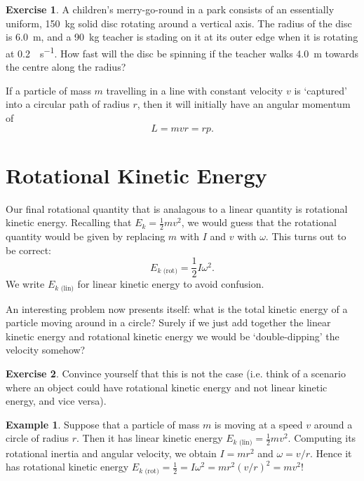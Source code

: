 \documentclass[a4paper]{amsbook}
\newcommand{\marginsymbol}{}
\newcommand{\ekl}{E_{k \text{ (lin)}}}
\newcommand{\ekr}{E_{k \text{ (rot)}}}
\theoremstyle{definition}
\newtheorem*{example}{Example}
\newtheorem{exercise}{Exercise}
\numberwithin{exercise}{chapter}
\numberwithin{exercise}{chapter}
\begin{document}
\begin{exercise}
  A children's merry-go-round in a park consists of an essentially uniform, \SI{150}{\kilo\gram} solid disc rotating around
  a vertical axis. The radius of the disc is \SI{6.0}{\metre}, and a \SI{90}{\kilo\gram} teacher is stading on it at its
  outer edge when it is rotating at \SI{0.2}{\revolution\per\second}. How fast will the disc be spinning if the teacher walks \SI{4.0}{\metre}
  towards the centre along the radius?
\end{exercise}

If a particle of mass $ m $ travelling in a line with constant velocity $ v $ is `captured' into a circular path of radius $ r $,
then it will initially have an angular momentum of
\begin{equation}
  L = mvr = rp.
\end{equation}

\section{Rotational Kinetic Energy}
Our final rotational quantity that is analagous to a linear quantity is rotational kinetic energy. Recalling that $ E_k = \frac{1}{2} mv^2 $,
we would guess that the rotational quantity would be given by replacing $ m $ with $ I $ and $ v $ with $ \omega $. This turns out to be
correct:
\begin{equation}
  \ekr = \frac{1}{2} I \omega^2.
\end{equation}
We write $ \ekl $ for linear kinetic energy to avoid confusion.

\marginsymbol An interesting problem now presents itself: what is the total kinetic energy of a particle moving around in a circle? Surely if
we just add together the linear kinetic energy and rotational kinetic energy we would be `double-dipping' the velocity somehow?

\begin{exercise}
  Convince yourself that this is not the case (i.e. think of a scenario where an object could have rotational kinetic energy and not
  linear kinetic energy, and vice versa).
\end{exercise}

\begin{example}
  Suppose that a particle of mass $ m $ is moving at a speed $ v $ around a circle of radius $ r $. Then it has linear kinetic
  energy $ \ekl = \frac{1}{2} mv^2 $. Computing its rotational inertia and angular velocity, we obtain $ I = mr^2 $ and $ \omega = v/r $.
  Hence it has rotational kinetic energy $ \ekr = \frac{1}{2} = I \omega^2 = mr^2 (v/r)^2 = mv^2 $!
\end{example}
\end{document}
